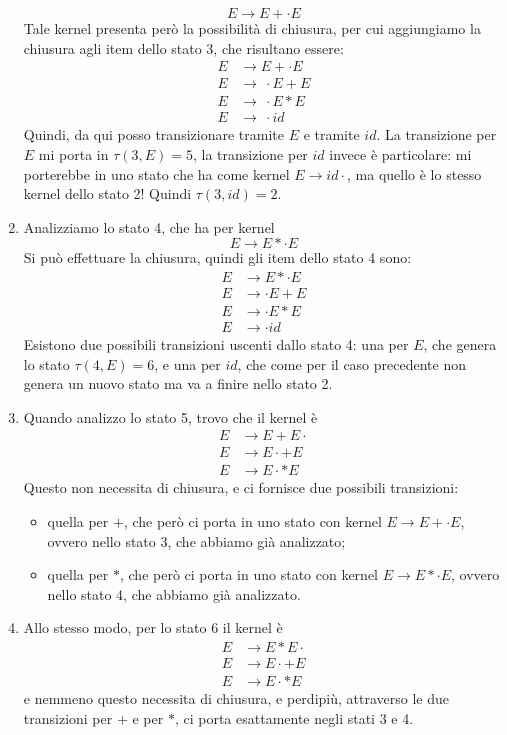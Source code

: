\documentclass[class=book, crop=false, oneside, 12pt]{standalone}
\begin{document}
\begin{enumerate}
    \begin{equation*}
        E \to E+ \cdot E
    \end{equation*}
    Tale kernel presenta però la possibilità di chiusura, per cui aggiungiamo la chiusura agli item dello stato 3, che risultano essere:
    \begin{align*}
        E &\to E+ \cdot E \\
        E &\to\ \cdot E+E \\
        E &\to\ \cdot E*E \\
        E &\to\ \cdot id
    \end{align*}
    Quindi, da qui posso transizionare tramite \(E\) e tramite \(id\). La transizione per \(E\) mi porta in \(\tau(3,E)=5\), la transizione per \(id\) invece è particolare: mi porterebbe in uno stato che ha come kernel \(E \to id\cdot\), ma quello è lo stesso kernel dello stato 2! Quindi \(\tau(3,id)=2\).
    \item Analizziamo lo stato 4, che ha per kernel
    \begin{equation*}
        E \to E*\cdot E 
    \end{equation*}
    Si può effettuare la chiusura, quindi gli item dello stato 4 sono:
    \begin{align*}
        E &\to E*\cdot E \\ 
        E &\to \cdot E+E \\
        E &\to \cdot E*E \\
        E &\to \cdot id
    \end{align*}
    Esistono due possibili transizioni uscenti dallo stato 4: una per \(E\), che genera lo stato \(\tau(4,E)=6\), e una per \(id\), che come per il caso precedente non genera un nuovo stato ma va a finire nello stato 2.
    \item Quando analizzo lo stato 5, trovo che il kernel è
    \begin{align*}
        E &\to E+E\cdot  \\
        E &\to E\cdot +E \\
        E &\to E\cdot *E
    \end{align*}
    Questo non necessita di chiusura, e ci fornisce due possibili transizioni:
    \begin{itemize}
        \item quella per \(+\), che però ci porta in uno stato con kernel \({E \to E + \cdot E}\), ovvero nello stato 3, che abbiamo già analizzato;
        \item quella per \(*\), che però ci porta in uno stato con kernel \({E \to E * \cdot E}\), ovvero nello stato 4, che abbiamo già analizzato.
    \end{itemize}
    \item Allo stesso modo, per lo stato 6 il kernel è
    \begin{align*}
        E &\to E*E\cdot  \\
        E &\to E\cdot +E \\
        E &\to E\cdot *E
    \end{align*}
    e nemmeno questo necessita di chiusura, e perdipiù, attraverso le due transizioni per \(+\) e per \(*\), ci porta esattamente negli stati 3 e 4.
\end{enumerate}
\end{document}

